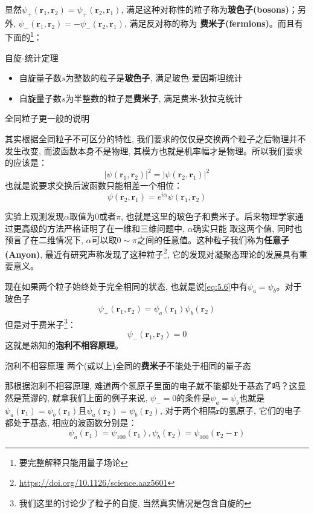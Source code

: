 显然$\psi_+(\mathbf{r}_1,\mathbf{r}_2)=\psi_+(\mathbf{r}_2,\mathbf{r}_1)$, 满足这种对称性的粒子称为\textbf{玻色子(bosons)}；另外, $\psi_-(\mathbf{r}_1,\mathbf{r}_2)=-\psi_-(\mathbf{r}_2,\mathbf{r}_1)$, 满足反对称的称为
\textbf{费米子(fermions)}。而且有下面的\footnote{要完整解释只能用量子场论}：
\begin{theorem}{自旋-统计定理}
    \begin{itemize}
        \item 自旋量子数$s$为整数的粒子是\textbf{玻色子}, 满足玻色-爱因斯坦统计
        \item 自旋量子数$s$为半整数的粒子是\textbf{费米子}, 满足费米-狄拉克统计
    \end{itemize}
\end{theorem}
\begin{history}{全同粒子更一般的说明}

    其实根据全同粒子不可区分的特性, 我们要求的仅仅是交换两个粒子之后物理并不发生改变, 而波函数本身不是物理, 其模方也就是机率幅才是物理。所以我们要求的应该是：
    \[\left|\psi(\mathbf{r}_1,\mathbf{r}_2)\right|^2=\left|\psi(\mathbf{r}_2,\mathbf{r}_1)\right|^2\]
    也就是说要求交换后波函数只能相差一个相位：
    \[\psi(\mathbf{r}_2,\mathbf{r}_1)=e^{i\alpha}\psi(\mathbf{r}_1,\mathbf{r}_2)\]

    \setlength\parindent{2em}实验上观测发现$\alpha$取值为$0$或者$\pi$, 也就是这里的玻色子和费米子。后来物理学家通过更高级的方法严格证明了在一维和三维问题中, $\alpha$确实只能
    取这两个值, 同时也预言了在二维情况下, $\alpha$可以取$0\sim\pi$之间的任意值。这种粒子我们称为\textbf{任意子(Anyon)}, 最近有研究声称发现了这种粒子\footnote{\href{https://doi.org/10.1126/science.aaz5601}{https://doi.org/10.1126/science.aaz5601}},
    它的发现对凝聚态理论的发展具有重要意义。
\end{history}

现在如果两个粒子始终处于完全相同的状态, 也就是说\ref{eq:5.6}中有$\psi_a=\psi_b$。对于玻色子
\[\psi_+(\mathbf{r}_1,\mathbf{r}_2)=\psi_a(\mathbf{r}_1)\psi_b(\mathbf{r}_2)\]
但是对于费米子\footnote{我们这里的讨论少了粒子的自旋, 当然真实情况是包含自旋的}：
\[\psi_-(\mathbf{r}_1,\mathbf{r}_2)=0\]
这就是熟知的\textbf{泡利不相容原理}。
\begin{theorem}{泡利不相容原理}
    两个(或以上)全同的\textbf{费米子}不能处于相同的量子态
\end{theorem}
那根据泡利不相容原理, 难道两个氢原子里面的电子就不能都处于基态了吗？这显然是荒谬的, 就拿我们上面的例子来说, $\psi_-=0$的条件是$\psi_a=\psi_b$也就是
$\psi_a(\mathbf{r}_1)=\psi_b(\mathbf{r}_1)$且$\psi_a(\mathbf{r}_2)=\psi_b(\mathbf{r}_2)$, 对于两个相隔$\mathbf{r}$的氢原子, 它们的电子都处于基态, 相应的波函数分别是：
\[\psi_a(\mathbf{r}_1)=\psi_{100}(\mathbf{r}_1), \psi_b(\mathbf{r}_2)=\psi_{100}(\mathbf{r}_2-\mathbf{r})\]

